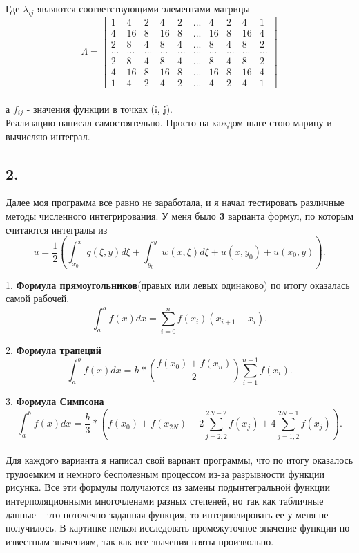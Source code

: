 \documentclass{report}
\begin{document}
Где $\lambda_{ij}$ являются соответствующими элементами матрицы
\\
$$ \Lambda =
\begin{bmatrix}
1 & 4 & 2 & 4 & 2 & ... & 4 & 2 & 4 & 1\\
4 & 16 & 8 & 16 & 8 & ... & 16 & 8 & 16 & 4\\
2 & 8 & 4 & 8 & 4 & ... & 8 & 4 & 8 & 2\\
... & ... & ... & ... & ... & ... & ... & ... & ... & ...\\
2 & 8 & 4 & 8 & 4 & ... & 8 & 4 & 8 & 2\\
4 & 16 & 8 & 16 & 8 & ... & 16 & 8 & 16 & 4\\
1 & 4 & 2 & 4 & 2 & ... & 4 & 2 & 4 & 1
\end{bmatrix}
$$ 
\\
а $f_{ij}$ - значения функции в точках (i, j).
\\
Реализацию написал самостоятельно. Просто на каждом шаге стою марицу и вычисляю интеграл. 

\subsection*{2.}
Далее моя программа все равно не заработала, и я начал тестировать различные методы численного интегрирования. У меня было \textbf{3} варианта формул, по которым считаются интегралы из 
$$	u = \frac{1}{2}(\int_{x_0}^x q(\xi, y)d\xi + \int_{y_0}^y w(x, \xi)d\xi + u(x, y_0) + u(x_0, y)). $$
\item 1. \textbf{Формула прямоугольников}(правых или левых одинаково) по итогу оказалась самой рабочей. $$ \int_a^b f(x)dx = \sum_{i=0}^{n}f(x_i)(x_{i+1}-x_i). $$
\item 2. \textbf{Формула трапеций}
	$$ \int_a^b f(x)dx = h*(\frac{f(x_0) + f(x_n)}{2})\sum_{i=1}^{n-1}f(x_i). $$

\item 3. \textbf{Формула Симпсона}
$$ \int_a^b f(x)dx = \frac{h}{3}*(f(x_0) + f(x_{2N}) + 2\sum_{j=2,2}^{2N-2}f(x_j) + 4\sum_{j=1,2}^{2N-1}f(x_j)). $$
\\
Для каждого варианта я написал свой вариант программы, что по итогу оказалось трудоемким и немного бесполезным процессом из-за разрывности функции рисунка. Все эти формулы получаются из замены подынтегральной функции интерполяционными многочленами разных степеней, но так как табличные данные -- это поточечно заданная функция, то интерполировать ее у меня не получилось. В картинке нельзя исследовать промежуточное значение функции по известным значениям, так как все значения взяты произвольно.\\
\end{document}
